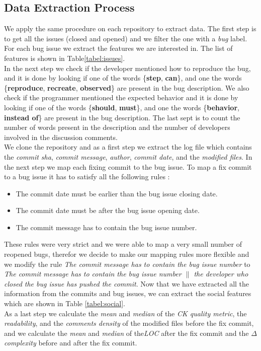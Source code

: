 \documentclass[sigconf,review]{acmart}
\begin{document}
\subsection{Data Extraction Process}
 We apply the same procedure on each repository to extract data. The first step is to get all the issues (closed and opened) and we filter the one with a \emph{bug} label.
 For each bug issue we extract the features we are interested in. The list of features is shown in Table\ref{tabel:issues}. \\In the next step we check if the developer mentioned how to reproduce the bug, and it is done by looking if one of the words \{\textbf{step},  \textbf{can}\}, and one the words  \{\textbf{reproduce}, \textbf{recreate}, \textbf{observed}\}  are present in the bug description. We also check if the programmer mentioned the expected behavior and it is done by looking if one of the words \{\textbf{should},  \textbf{must}\}, and one the  words  \{\textbf{behavior}, \textbf{instead of}\} are present in the bug description. The last sept is to count the number of words present in the description and the number of developers involved in the discussion comments.\\
 We clone the repository and as a first step we extract the log file which contains the \emph{commit sha}, \emph{commit message}, \emph{author}, \emph{commit date}, and the \emph{modified files}. In the next step we map each fixing commit to the bug issue. To map a fix commit to a bug issue it has to satisfy all the following rules :
  \begin{itemize}
 	\item The commit date must be earlier than the bug issue closing date.
 	\item The commit date must be after the bug issue opening date.
 	\item The commit message has to contain the bug issue number.
 	\end{itemize}
These rules were very strict and we were able to map a very small number of reopened bugs, therefor we decide to make our mapping rules more flexible and we modify the rule \emph{The commit message has to contain the bug issue number} to \emph{The commit message has to contain the bug issue number $\parallel$ the developer who closed the bug issue has pushed the commit}. Now that we have extracted all the information from the commits and bug issues, we can extract the social features which are shown in Table \ref{tabel:social}.\\ As a last step we calculate the \emph{mean} and \emph{median} of the \emph{CK quality metric}, the \emph{readability}, and the \emph{comments density} of the modified files before the fix commit, and we calculate the \emph{mean} and \emph{median} of the\emph{LOC} after the fix commit and the \emph{$\Delta$ complexity} before and after the fix commit.
\end{document}
